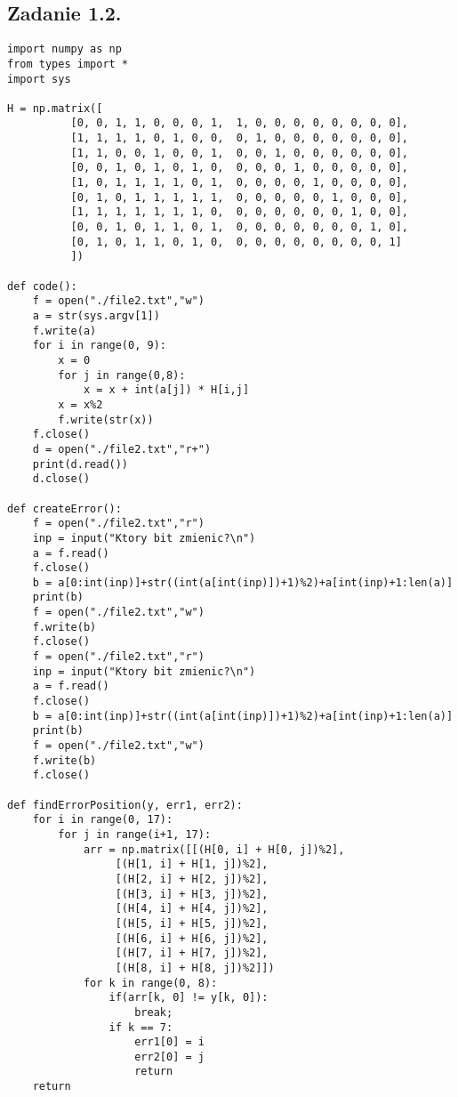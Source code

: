 \documentclass[a4paper, portrait,11pt]{article}
\begin{document}
\subsection*{Zadanie 1.2.}
\begin{lstlisting}
import numpy as np
from types import *
import sys

H = np.matrix([
	      [0, 0, 1, 1, 0, 0, 0, 1,	1, 0, 0, 0, 0, 0, 0, 0, 0],
	      [1, 1, 1, 1, 0, 1, 0, 0,	0, 1, 0, 0, 0, 0, 0, 0, 0],
	      [1, 1, 0, 0, 1, 0, 0, 1,	0, 0, 1, 0, 0, 0, 0, 0, 0],
	      [0, 0, 1, 0, 1, 0, 1, 0,	0, 0, 0, 1, 0, 0, 0, 0, 0],
	      [1, 0, 1, 1, 1, 1, 0, 1,	0, 0, 0, 0, 1, 0, 0, 0, 0],
	      [0, 1, 0, 1, 1, 1, 1, 1,	0, 0, 0, 0, 0, 1, 0, 0, 0],
	      [1, 1, 1, 1, 1, 1, 1, 0,	0, 0, 0, 0, 0, 0, 1, 0, 0],
	      [0, 0, 1, 0, 1, 1, 0, 1,	0, 0, 0, 0, 0, 0, 0, 1, 0],
	      [0, 1, 0, 1, 1, 0, 1, 0,	0, 0, 0, 0, 0, 0, 0, 0, 1]
	      ])

def code():
    f = open("./file2.txt","w")
    a = str(sys.argv[1])
    f.write(a)
    for i in range(0, 9):
	    x = 0
	    for j in range(0,8):
		    x = x + int(a[j]) * H[i,j]
	    x = x%2
	    f.write(str(x))
    f.close()
    d = open("./file2.txt","r+")
    print(d.read())
    d.close()

def createError():
    f = open("./file2.txt","r")
    inp = input("Ktory bit zmienic?\n")
    a = f.read()
    f.close()
    b = a[0:int(inp)]+str((int(a[int(inp)])+1)%2)+a[int(inp)+1:len(a)]
    print(b)
    f = open("./file2.txt","w")
    f.write(b)
    f.close()
    f = open("./file2.txt","r")
    inp = input("Ktory bit zmienic?\n")
    a = f.read()
    f.close()
    b = a[0:int(inp)]+str((int(a[int(inp)])+1)%2)+a[int(inp)+1:len(a)]
    print(b)
    f = open("./file2.txt","w")
    f.write(b)
    f.close()

def findErrorPosition(y, err1, err2):
    for i in range(0, 17):
        for j in range(i+1, 17):
            arr = np.matrix([[(H[0, i] + H[0, j])%2],
			     [(H[1, i] + H[1, j])%2],
			     [(H[2, i] + H[2, j])%2],
			     [(H[3, i] + H[3, j])%2],
			     [(H[4, i] + H[4, j])%2],
			     [(H[5, i] + H[5, j])%2],
			     [(H[6, i] + H[6, j])%2],
			     [(H[7, i] + H[7, j])%2],
			     [(H[8, i] + H[8, j])%2]])
            for k in range(0, 8):
                if(arr[k, 0] != y[k, 0]):
                    break;
                if k == 7:
                    err1[0] = i
                    err2[0] = j
                    return
    return


\end{lstlisting}
\end{document}
